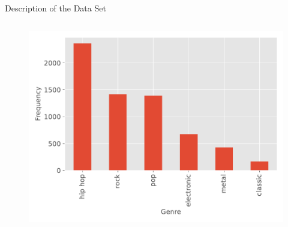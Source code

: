 \begin{frame}{Description of the Data Set}
\begin{columns}[t]
\begin{column}{0.8\textwidth}
\begin{figure}
                \includegraphics[width=\textwidth]{../figures/genre_hist.pdf}
            \end{figure}
        \end{column}
    \end{columns}
\end{frame}